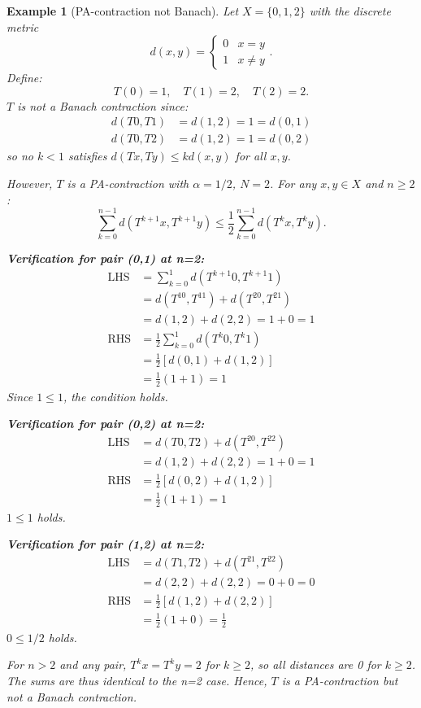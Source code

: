 \documentclass[11pt]{article}
\newtheorem{example}[theorem]{Example}
\begin{document}
\begin{example}[PA-contraction not Banach]
Let $ X = \{0, 1, 2\} $ with the discrete metric 
\begin{equation}
d(x,y) = \begin{cases} 0 & x=y \\ 1 & x \ne y \end{cases}.
\end{equation} 
Define:
\begin{equation}
T(0) = 1, \quad T(1) = 2, \quad T(2) = 2.
\end{equation}
$T$ is not a Banach contraction since:
\begin{align*}
d(T0,T1) &= d(1,2) = 1 = d(0,1) \\
d(T0,T2) &= d(1,2) = 1 = d(0,2)
\end{align*}
so no $k < 1$ satisfies $d(Tx,Ty) \leq k d(x,y)$ for all $x,y$.

However, $T$ is a PA-contraction with $\alpha = 1/2$, $N = 2$. For any $x,y \in X$ and $n \geq 2$:
\begin{equation}
\sum_{k=0}^{n-1} d(T^{k+1}x, T^{k+1}y) \leq \frac{1}{2} \sum_{k=0}^{n-1} d(T^k x, T^k y).
\end{equation}

\textbf{Verification for pair (0,1) at n=2:}
\begin{align*}
\text{LHS} &= \sum_{k=0}^{1} d(T^{k+1}0, T^{k+1}1) \\
&= d(T^10, T^11) + d(T^20, T^21) \\
&= d(1,2) + d(2,2) = 1 + 0 = 1 \\
\text{RHS} &= \frac{1}{2} \sum_{k=0}^{1} d(T^k0, T^k1) \\
&= \frac{1}{2} \left[ d(0,1) + d(1,2) \right] \\
&= \frac{1}{2} (1 + 1) = 1
\end{align*}
Since $1 \leq 1$, the condition holds.

\textbf{Verification for pair (0,2) at n=2:}
\begin{align*}
\text{LHS} &= d(T0,T2) + d(T^20,T^22) \\
&= d(1,2) + d(2,2) = 1 + 0 = 1 \\
\text{RHS} &= \frac{1}{2} \left[ d(0,2) + d(1,2) \right] \\
&= \frac{1}{2} (1 + 1) = 1
\end{align*}
$1 \leq 1$ holds.

\textbf{Verification for pair (1,2) at n=2:}
\begin{align*}
\text{LHS} &= d(T1,T2) + d(T^21,T^22) \\
&= d(2,2) + d(2,2) = 0 + 0 = 0 \\
\text{RHS} &= \frac{1}{2} \left[ d(1,2) + d(2,2) \right] \\
&= \frac{1}{2} (1 + 0) = \frac{1}{2}
\end{align*}
$0 \leq 1/2$ holds.

For $n > 2$ and any pair, $T^k x = T^k y = 2$ for $k \geq 2$, so all distances are 0 for $k \geq 2$. The sums are thus identical to the n=2 case.
Hence, $ T $ is a PA-contraction but not a Banach contraction.
\label{ex:panotbanach}
\end{example}
\end{document}
